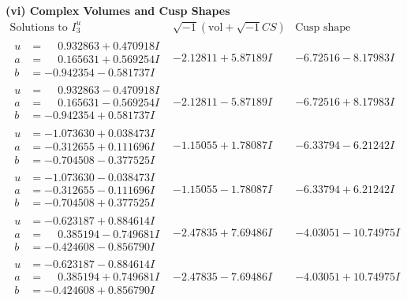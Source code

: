 \documentclass[1p]{elsarticle_modified}
\theoremstyle{definition}
\newcommand{\I}{\sqrt{-1}}
\begin{document}
\newpage\flushleft \textbf{(vi) Complex Volumes and Cusp Shapes}
$$\begin{array}{c|c|c}  
\text{Solutions to }I^u_{3}& \I (\text{vol} + \sqrt{-1}CS) & \text{Cusp shape}\\
 \hline 
\begin{aligned}
u &= \phantom{-}0.932863 + 0.470918 I \\
a &= \phantom{-}0.165631 + 0.569254 I \\
b &= -0.942354 - 0.581737 I\end{aligned}
 & -2.12811 + 5.87189 I & -6.72516 - 8.17983 I \\ \hline\begin{aligned}
u &= \phantom{-}0.932863 - 0.470918 I \\
a &= \phantom{-}0.165631 - 0.569254 I \\
b &= -0.942354 + 0.581737 I\end{aligned}
 & -2.12811 - 5.87189 I & -6.72516 + 8.17983 I \\ \hline\begin{aligned}
u &= -1.073630 + 0.038473 I \\
a &= -0.312655 + 0.111696 I \\
b &= -0.704508 - 0.377525 I\end{aligned}
 & -1.15055 + 1.78087 I & -6.33794 - 6.21242 I \\ \hline\begin{aligned}
u &= -1.073630 - 0.038473 I \\
a &= -0.312655 - 0.111696 I \\
b &= -0.704508 + 0.377525 I\end{aligned}
 & -1.15055 - 1.78087 I & -6.33794 + 6.21242 I \\ \hline\begin{aligned}
u &= -0.623187 + 0.884614 I \\
a &= \phantom{-}0.385194 - 0.749681 I \\
b &= -0.424608 - 0.856790 I\end{aligned}
 & -2.47835 + 7.69486 I & -4.03051 - 10.74975 I \\ \hline\begin{aligned}
u &= -0.623187 - 0.884614 I \\
a &= \phantom{-}0.385194 + 0.749681 I \\
b &= -0.424608 + 0.856790 I\end{aligned}
 & -2.47835 - 7.69486 I & -4.03051 + 10.74975 I \\ \hline\begin{aligned}

\end{aligned}
\end{array}$$
\end{document}
